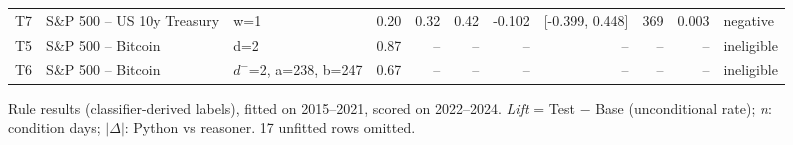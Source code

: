 \begin{figure}[t]
{\begin{tabular}{lllrrrrrrrl}
T7 & S\&P 500 -- US 10y Treasury & w=1 & 0.20 & 0.32 & 0.42 & -0.102 & [-0.399, 0.448] & 369 & 0.003 & negative \\
T5 & S\&P 500 -- Bitcoin & d=2 & 0.87 & -- & -- & -- & -- & -- & -- & ineligible \\
T6 & S\&P 500 -- Bitcoin & $d^-$=2, a=238, b=247 & 0.67 & -- & -- & -- & -- & -- & -- & ineligible \\
\bottomrule
\end{tabular}
}
\caption{\small{Rule results (classifier-derived labels), fitted on 2015--2021, scored on 2022--2024. \emph{Lift} = Test $-$ Base (unconditional rate); \emph{n}: condition days; $|\Delta|$: Python vs reasoner. 17 unfitted rows omitted.}}
\label{fig:rule-results_classifier-pub}
\end{figure}

